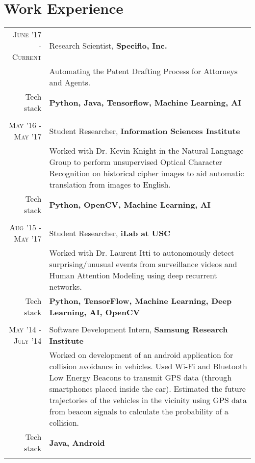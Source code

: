 \section{Work Experience}
\renewcommand{\arraystretch}{0.85}%
\begin{tabular}{r|p{13cm}}
\textsc{June '17 - Current} & Research Scientist, \textbf{Specifio, Inc.} \\
& \small{Automating the Patent Drafting Process for Attorneys and Agents.}\\
\small{Tech stack} &\footnotesize{\textbf{Python, Java, Tensorflow, Machine Learning, AI}} \\
\multicolumn{2}{c}{} \\

\textsc{May '16 - May '17} & Student Researcher, \textbf{Information Sciences Institute} \\
& \small{Worked with Dr. Kevin Knight in the Natural Language Group to perform unsupervised Optical Character Recognition on historical cipher images to aid automatic translation from images to English.}\\
\small{Tech stack} &\footnotesize{\textbf{Python, OpenCV, Machine Learning, AI}} \\
\multicolumn{2}{c}{} \\

\textsc{Aug '15 - May '17} & Student Researcher, \textbf{iLab at USC} \\
& \small{Worked with Dr. Laurent Itti to autonomously detect surprising/unusual events from surveillance videos and Human Attention Modeling using deep recurrent networks.}\\
\small{Tech stack} &\footnotesize{\textbf{Python, TensorFlow, Machine Learning, Deep Learning, AI, OpenCV}} \\
\multicolumn{2}{c}{} \\

\textsc{May '14 - July '14 } & Software Development Intern, \textbf{Samsung Research Institute} \\
& \small{Worked on development of an android application for collision avoidance in vehicles. Used Wi-Fi and Bluetooth Low Energy Beacons to transmit GPS data (through smartphones placed inside the car). Estimated the future trajectories of the vehicles in the vicinity using GPS data from beacon signals to calculate the probability of a collision.}\\
\small{Tech stack} &\footnotesize{\textbf{Java, Android}} \\
\multicolumn{2}{c}{}


\end{tabular}
